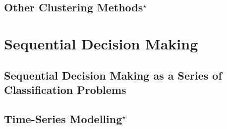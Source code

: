 \documentclass{report}
\newcommand{\todo}[1]{{\Large\textcolor{red}{#1}}}
\begin{document}
\section{Other Clustering Methods$^\star$}


\chapter{Sequential Decision Making}

\section{Sequential Decision Making as a Series of Classification Problems}
\todo{}


\section{Time-Series Modelling$^\star$}
\label{sec:timeseries}











\end{document}
